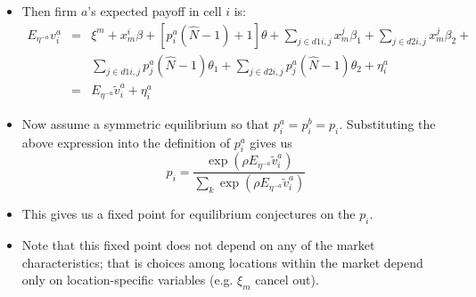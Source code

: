 \documentclass[notes=show]{beamer}
\begin{document}
\begin{frame}%


\begin{itemize}
\item Then firm $a$'s expected payoff in cell $i$ is: 
\begin{eqnarray*}
E_{\eta ^{-a}}v_{i}^{a} &=&\xi ^{m}+x_{m}^{i}\beta +[p_{i}^{a}(\hat{N}%
-1)+1]\theta +\sum_{j\in d1i,j}x_{m}^{j}\beta _{1}+\sum_{j\in
d2i,j}x_{m}^{j}\beta _{2}+ \\
&&\sum_{j\in d1i,j}p_{j}^{a}(\hat{N}-1)\theta _{1}+\sum_{j\in
d2i,j}p_{j}^{a}(\hat{N}-1)\theta _{2}+\eta _{i}^{a} \\
&=&E_{\eta ^{-a}}\tilde{v}_{i}^{a}+\eta _{i}^{a}
\end{eqnarray*}

\item Now assume a symmetric equilibrium so that $p_{i}^{a}=p_{i}^{b}=p_{i}.$
Substituting the above expression into the definition of $p_{i}^{a}$ gives
us 
\begin{equation*}
p_{i}=\frac{\exp (\rho E_{\eta ^{-a}}\tilde{v}_{i}^{a})}{\sum_{k}\exp (\rho
E_{\eta ^{-a}}\tilde{v}_{i}^{a})}
\end{equation*}

\item This gives us a fixed point for equilibrium conjectures on the $p_{i}$.

\item Note that this fixed point does not depend on any of the market
characteristics; that is choices among locations within the market depend
only on location-specific variables (e.g. $\xi _{m}$ cancel out).
\end{itemize}

\end{frame}%
\end{document}
